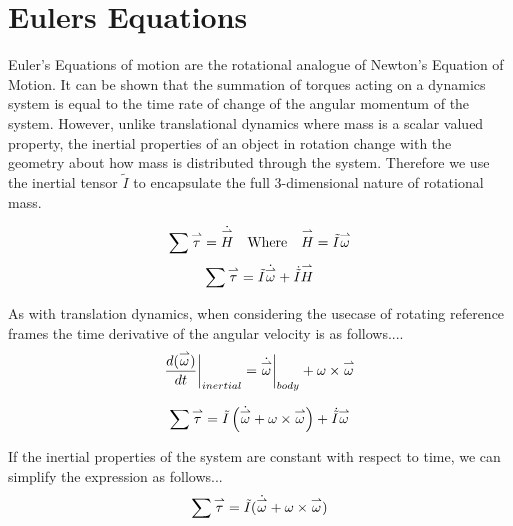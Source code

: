 
\section{Eulers Equations}

Euler's Equations of motion are the rotational analogue of Newton's Equation of Motion. It can be shown that the summation of torques acting on a dynamics system is equal to the time rate of change of the angular momentum of the system. However, unlike translational dynamics where mass is a scalar valued property, the inertial properties of an object in rotation change with the geometry about how mass is distributed through the system. Therefore we use the inertial tensor $\tilde{I}$ to encapsulate the full 3-dimensional nature of rotational mass. 

$$\sum \overset{\rightharpoonup}{\tau} = \dot{\overset{\rightharpoonup}{H}} \quad \text{Where} \quad \overset{\rightharpoonup}{H} = \tilde{I}\overset{\rightharpoonup}{\omega}$$ 
$$\sum\overset{\rightharpoonup}{\tau} = \tilde{I}\dot{\overset{\rightharpoonup}{\omega}} + \dot{\tilde{I}}\overset{\rightharpoonup}{H}$$

As with translation dynamics, when considering the usecase of rotating reference frames the time derivative of the angular velocity is as follows.... 
$$\frac{d(\overset{\rightharpoonup}{\omega})}{dt}\biggr \rvert_{inertial} = \dot{\overset{\rightharpoonup}{\omega}}\biggr \rvert_{body} + \omega \times \overset{\rightharpoonup}{\omega}$$

$$\sum\overset{\rightharpoonup}{\tau} = \tilde{I}\left(\dot{\overset{\rightharpoonup}{\omega}} + \omega \times \overset{\rightharpoonup}{\omega}\right) + \dot{\tilde{I}}\overset{\rightharpoonup}{\omega}$$

If the inertial properties of the system are constant with respect to time, we can simplify the expression as follows...  
$$\sum\overset{\rightharpoonup}{\tau} = \tilde{I}(\dot{\overset{\rightharpoonup}{\omega}} + \omega \times \overset{\rightharpoonup}{\omega})$$
